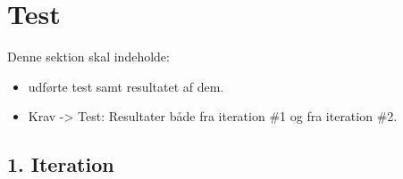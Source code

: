 \section{Test}
Denne sektion skal indeholde:

\begin{itemize}
    \item udførte test samt resultatet af dem. 
    \item Krav -> Test: Resultater både fra iteration \#1 og fra iteration \#2.
\end{itemize}{}

\subsection{1. Iteration}